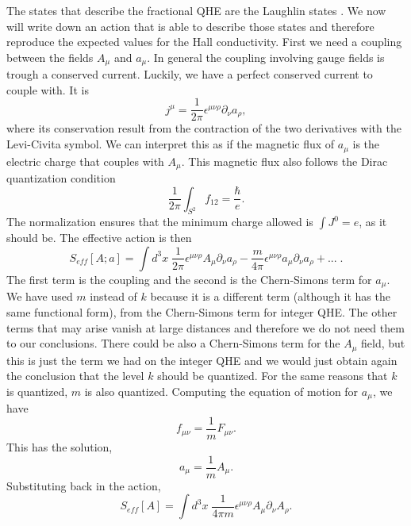 \documentclass{article}
\begin{document}
The states that describe the fractional QHE are the Laughlin states \cite{PhysRevLett.50.1395}. We now will write down an action that is able to describe those states and therefore reproduce the expected values for the Hall conductivity. First we need a coupling between the fields $A_\mu$ and $a_\mu$. In general the coupling involving gauge fields is trough a conserved current. Luckily, we have a perfect conserved current to couple with. It is 
\begin{equation}\label{electron current}
	j^{\mu}=\frac{1}{2\pi}\epsilon^{\mu\nu\rho}\partial_\nu a_\rho,
\end{equation}
where its conservation result from the contraction of the two derivatives with the Levi-Civita symbol. We can interpret this as if the magnetic flux of $a_\mu$ is the electric charge that couples with $A_\mu$. This magnetic flux also follows the Dirac quantization condition 
\begin{equation}
	\frac{1}{2\pi}\int_{S^2}f_{12}=\frac{\hbar}{e}.
\end{equation}
The normalization ensures that the minimum charge allowed is $\int J^0=e$, as it should be. The effective action is then 
\begin{equation}
	S_{eff}[A;a]=\int d^3x\;\frac{1}{2\pi}\epsilon^{\mu\nu\rho}A_\mu\partial_\nu a_\rho-\frac{m}{4\pi}\epsilon^{\mu\nu\rho}a_\mu\partial_\nu a_\rho+...\;.
\end{equation}
The first term is the coupling and the second is the Chern-Simons term for $a_\mu$. We have used $m$ instead of $k$ because it is a different term (although it has the same functional form), from the Chern-Simons term for integer QHE. The other terms that may arise vanish at large distances and therefore we do not need them to our conclusions. There could be also a Chern-Simons term for the $A_\mu$ field, but this is just the term we had on the integer QHE and we would just obtain again the conclusion that the level $k$ should be quantized. For the same reasons that $k$ is quantized, $m$ is also quantized. Computing the equation of motion for $a_\mu$, we have  
\begin{equation}
	f_{\mu\nu}=\frac{1}{m}F_{\mu\nu}.
\end{equation}
This has the solution, 
\begin{equation}
	a_\mu=\frac{1}{m}A_{\mu}.  
\end{equation}
Substituting back in the action, 
\begin{equation}
	S_{eff}[A]=\int d^3x\;\frac{1}{4\pi m}\epsilon^{\mu\nu\rho}A_{\mu}\partial_\nu A_\rho. 
\end{equation}
\end{document}
